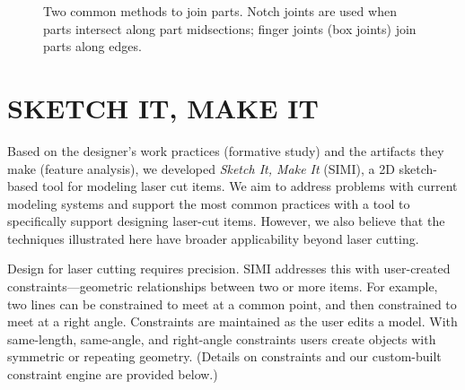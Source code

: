 \documentclass{article}
\begin{document}
\begin{figure}[h]
\centering 
{}
\caption{Two common methods to join parts. Notch joints are used when
  parts intersect along part midsections; finger joints (box joints)
  join parts along edges.}
\label{fig:joint}
\end{figure}

\section{SKETCH IT, MAKE IT}

Based on the designer's work practices (formative study) and the
artifacts they make (feature analysis), we developed \textit{Sketch
  It, Make It} (SIMI), a 2D sketch-based tool for modeling laser cut
items. We aim to address problems with current modeling systems and
support the most common practices with a tool to specifically support
designing laser-cut items. However, we also believe that the
techniques illustrated here have broader applicability beyond laser
cutting. 

Design for laser cutting requires precision. SIMI addresses this with
user-created constraints---geometric relationships between two or more
items. For example, two lines can be constrained to meet at a common
point, and then constrained to meet at a right angle. Constraints are
maintained as the user edits a model. With same-length, same-angle,
and right-angle constraints users create objects with symmetric or
repeating geometry. (Details on constraints and our custom-built
constraint engine are provided below.)
\end{document}
